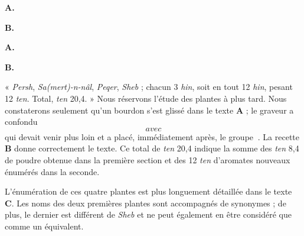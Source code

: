 \documentclass[a4paper, 11pt, oneside]{article}
\newcommand*\hieroAAAR{}
\newcommand*\hieroAABT{}
\newcommand*\hieroAAEH{\raisebox{0.5ex}{}}
\newcommand*\hieroAAFO{\raisebox{0.5ex}{}}
\newcommand*\hieroAAFT{}
\newcommand*\hieroAAGA{}
\newcommand*\hieroAAGD{}
\newcommand*\hieroAAGN{}
\newcommand*\hieroAAHX{}
\newcommand*\hieroAAIT{}
\newcommand*\hieroAAIU{}
\newcommand*\hieroAAJH{}
\newcommand*\hieroAAKW{}
\newcommand*\hieroAAKX{}
\newcommand*\hieroAAKY{}
\newcommand*\hieroAAKZ{}
\newcommand*\hieroAALA{}
\newcommand*\hieroAALB{}
\newcommand*\hieroAALC{}
\newcommand*\hieroAALD{}
\newcommand*\hieroAALE{}
\newcommand*\hieroAALF{}
\newcommand*\hieroAALG{}
\newcommand*\hieroAALH{}
\newcommand*\hieroAALI{}
\newcommand*\hieroAALJ{}
\newcommand*\hieroAAMQ{}
\begin{document}
\hspace*{10mm}\textbf{A.}\hspace*{5mm} $\hieroAAKW\:\hieroAAAR\:\hieroAAKX$ \hspace*{5mm} $\hieroAAKY\:\hieroAAKZ\:\hieroAAKX$ \hspace*{7.2mm} $\hieroAALA\:\hieroAAAR\:\hieroAAKX$ \hspace*{5mm} $\hieroAALB\:\hieroAAAR\:\hieroAAKX$

\hspace*{10mm}\textbf{B.}\hspace*{5mm} $\hieroAALC\:\hieroAAFO\:\hieroAALD$ \hspace*{6mm} $\hieroAALE\:\hieroAAEH\:\hieroAALF\:\hieroAAGD\:\hieroAABT\:\hieroAAKX$ \hspace*{1mm} $\hieroAALA\:\hieroAAGD\:\hieroAAKX$ \hspace*{5mm} $\hieroAAHX\:\hieroAAFO\:\hieroAAKX$

\hspace*{10mm}\textbf{A.}\hspace*{5mm} $\hieroAALG\:\hieroAAIU$ \hspace*{15mm} $\hieroAAIT\:\hieroAAIU\:\hieroAAGA\:\hieroAAJH$

\hspace*{10mm}\textbf{B.}\hspace*{5mm} $\hieroAALG\:\hieroAAIU\:\hieroAAGN\:\hieroAAFT\:\hieroAAIU\:\hieroAAGN\:\hieroAAFT\:\hieroAAMQ\:\hieroAAGA\:\hieroAALH$

« \emph{Persh}, \emph{Sa(mert)-n-nâl}, \emph{Peqer}, \emph{Sheb} ; chacun 3 \emph{hin}, soit en tout 12 \emph{hin}, pesant 12 \emph{ten}. Total, \emph{ten} 20,4. » Nous réservons l'étude des plantes à plus tard. Nous constaterons seulement qu'un bourdon s'est glissé dans le texte \textbf{A} ; le graveur a confondu $\hieroAALI$ avec $\hieroAALJ$ qui devait venir plus loin et a placé, immédiatement après, le groupe $\hieroAAGA\:\hieroAAJH$. La recette \textbf{B} donne correctement le texte. Ce total de \emph{ten} 20,4 indique la somme des \emph{ten} 8,4 de poudre obtenue dans la première section et des 12 \emph{ten} d'aromates nouveaux énumérés dans la seconde.

L'énumération de ces quatre plantes est plus longuement détaillée dans le texte \textbf{C}. Les noms des deux premières plantes sont accompagnés de synonymes ; de plus, le dernier est différent de \emph{Sheb} et ne peut également en être considéré que comme un équivalent.
\end{document}
